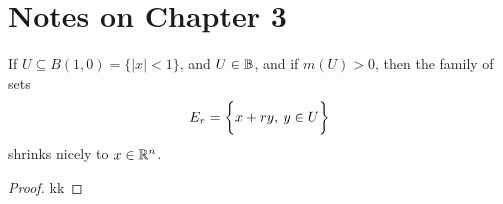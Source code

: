\documentclass[../../main.tex]{subfiles}
\begin{document}
\section*{Notes on Chapter 3}
\begin{wts}
    If $U\subseteq B(1,0)=\{|x|<1\}$, and $U\in{\mathbb{B}}$, and if $m(U)>0$, then the family of sets 
    \[
    E_r = \biggl\{{x+ry,\:y\in U}\biggr\}
    \]
    shrinks nicely to $x\in{\mathbb{R}^n}$.
\end{wts}
\begin{proof}
    kk
\end{proof}
\end{document}
